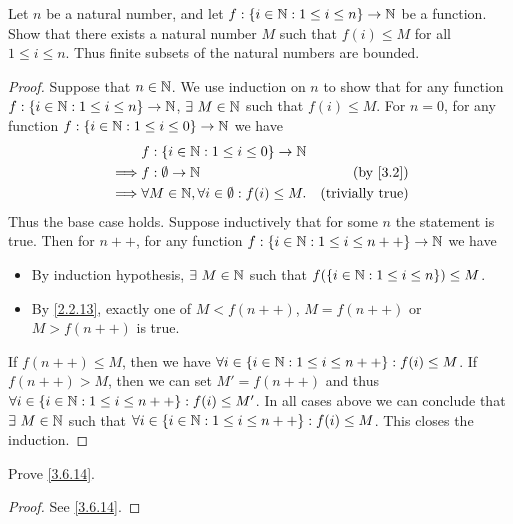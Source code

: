 \begin{ex}\label{ex:3.6.3}
  Let \(n\) be a natural number, and let \(f : \{i \in \mathbb{N} : 1 \leq i \leq n\} \to \mathbb{N}\) be a function.
  Show that there exists a natural number \(M\) such that \(f(i) \leq M\) for all \(1 \leq i \leq n\).
  Thus finite subsets of the natural numbers are bounded.
\end{ex}

\begin{proof}
  Suppose that \(n \in \mathbb{N}\).
  We use induction on \(n\) to show that for any function \(f : \{i \in \mathbb{N} : 1 \leq i \leq n\} \to \mathbb{N}\), \(\exists\ M \in \N\) such that \(f(i) \leq M\).
  For \(n = 0\), for any function \(f : \{i \in \mathbb{N} : 1 \leq i \leq 0\} \to \mathbb{N}\) we have
  \begin{align*}
             & f : \{i \in \N : 1 \leq i \leq 0\} \to \N                                          \\
    \implies & f : \emptyset \to \N                                     & \text{(by \cref{3.2})}  \\
    \implies & \forall M \in \N, \forall i \in \emptyset : f(i) \leq M. & \text{(trivially true)} \\
  \end{align*}
  Thus the base case holds.
  Suppose inductively that for some \(n\) the statement is true.
  Then for \(n++\), for any function \(f : \{i \in \mathbb{N} : 1 \leq i \leq n++\} \to \mathbb{N}\) we have
  \begin{itemize}
    \item By induction hypothesis, \(\exists\ M \in \N\) such that \(f(\{i \in \mathbb{N} : 1 \leq i \leq n\}) \leq M\).
    \item By \cref{2.2.13}, exactly one of \(M < f(n++)\), \(M = f(n++)\) or \(M > f(n++)\) is true.
  \end{itemize}
  If \(f(n++) \leq M\), then we have \(\forall i \in \{i \in \mathbb{N} : 1 \leq i \leq n++\} : f(i) \leq M\).
  If \(f(n++) > M\), then we can set \(M' = f(n++)\) and thus \(\forall i \in \{i \in \mathbb{N} : 1 \leq i \leq n++\} : f(i) \leq M'\).
  In all cases above we can conclude that \(\exists\ M \in \N\) such that \(\forall i \in \{i \in \mathbb{N} : 1 \leq i \leq n++\} : f(i) \leq M\).
  This closes the induction.
\end{proof}

\begin{ex}\label{ex:3.6.4}
  Prove \cref{3.6.14}.
\end{ex}

\begin{proof}
  See \cref{3.6.14}.
\end{proof}

